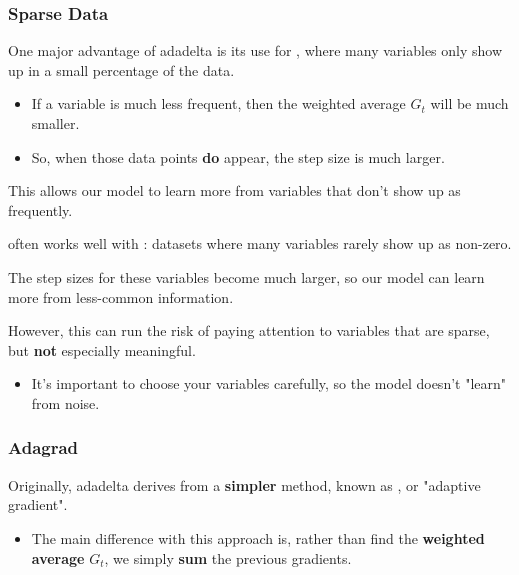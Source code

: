         \subsubsection{Sparse Data}

            One major advantage of adadelta is its use for , where many variables only show up in a small percentage of the data.

            \begin{itemize}
                \item If a variable is much less frequent, then the weighted average $G_t$ will be much smaller.
                \item So, when those data points \textbf{do} appear, the step size is much larger.
            \end{itemize}

            This allows our model to learn more from variables that don't show up as frequently.\\

            \begin{concept}
                 often works well with : datasets where many variables rarely show up as non-zero.

                The step sizes for these variables become much larger, so our model can learn more from less-common information.
            \end{concept}

            However, this can run the risk of paying attention to variables that are sparse, but \textbf{not} especially meaningful. 
            
            \begin{itemize}
                \item It's important to choose your variables carefully, so the model doesn't "learn" from noise.
            \end{itemize}

        \subsubsection{Adagrad}

            Originally, adadelta derives from a \textbf{simpler} method, known as , or "adaptive gradient".

            \begin{itemize}
                \item The main difference with this approach is, rather than find the \textbf{weighted average} $G_t$, we simply \textbf{sum} the previous gradients.
            \end{itemize}

